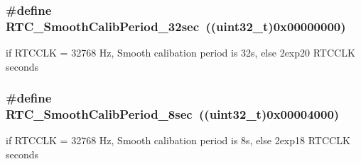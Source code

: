 \subsubsection[{R\+T\+C\+\_\+\+Smooth\+Calib\+Period\+\_\+32sec}]{\setlength{\rightskip}{0pt plus 5cm}\#define R\+T\+C\+\_\+\+Smooth\+Calib\+Period\+\_\+32sec~((uint32\+\_\+t)0x00000000)}\label{group___r_t_c___smooth__calib__period___definitions_ga1410c28a3644ce52dfbdf2f21a037eef}
if R\+T\+C\+C\+L\+K = 32768 Hz, Smooth calibation period is 32s, else 2exp20 R\+T\+C\+C\+L\+K seconds \hypertarget{group___r_t_c___smooth__calib__period___definitions_ga8a34f8b7e145649bad2ec36b69eccbd3}{}
\subsubsection[{R\+T\+C\+\_\+\+Smooth\+Calib\+Period\+\_\+8sec}]{\setlength{\rightskip}{0pt plus 5cm}\#define R\+T\+C\+\_\+\+Smooth\+Calib\+Period\+\_\+8sec~((uint32\+\_\+t)0x00004000)}\label{group___r_t_c___smooth__calib__period___definitions_ga8a34f8b7e145649bad2ec36b69eccbd3}
if R\+T\+C\+C\+L\+K = 32768 Hz, Smooth calibation period is 8s, else 2exp18 R\+T\+C\+C\+L\+K seconds 